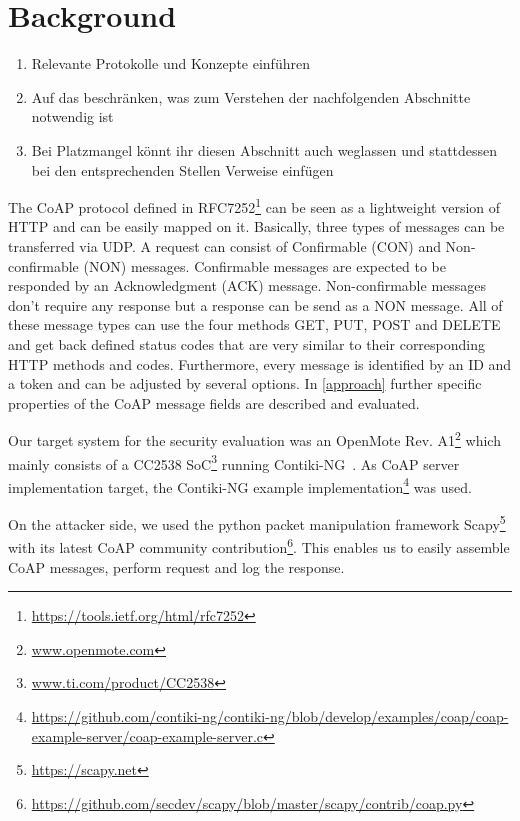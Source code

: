 \section{Background}

\begin{enumerate}
	\item Relevante Protokolle und Konzepte einführen
	\item Auf das beschränken, was zum Verstehen der nachfolgenden Abschnitte notwendig ist
	\item Bei Platzmangel könnt ihr diesen Abschnitt auch weglassen und stattdessen bei den entsprechenden Stellen Verweise einfügen
\end{enumerate}

The CoAP protocol defined in RFC7252\footnote{\url{https://tools.ietf.org/html/rfc7252}} can be seen as a lightweight version of HTTP and can be easily mapped on it. Basically, three types of messages can be transferred via UDP. A request can consist of Confirmable (CON) and Non-confirmable (NON) messages. Confirmable messages are expected to be responded by an Acknowledgment (ACK) message. Non-confirmable messages don't require any response but a response can be send as a NON message. All of these message types can use the four methods GET, PUT, POST and DELETE and get back defined status codes that are very similar to their corresponding HTTP methods and codes. Furthermore, every message is identified by an ID and a token and can be adjusted by several options. In \autoref{approach} further specific properties of the CoAP message fields are described and evaluated.

Our target system for the security evaluation was an OpenMote Rev. A1\footnote{\url{www.openmote.com}} which mainly consists of a CC2538 SoC\footnote{\url{www.ti.com/product/CC2538}} running Contiki-NG~\cite{contiki}. As CoAP server implementation target, the Contiki-NG example implementation\footnote{\url{https://github.com/contiki-ng/contiki-ng/blob/develop/examples/coap/coap-example-server/coap-example-server.c}} was used.

On the attacker side, we used the python packet manipulation framework Scapy\footnote{\url{https://scapy.net}} with its latest CoAP community contribution\footnote{\url{https://github.com/secdev/scapy/blob/master/scapy/contrib/coap.py}}. This enables us to easily assemble CoAP messages, perform request and log the response.

